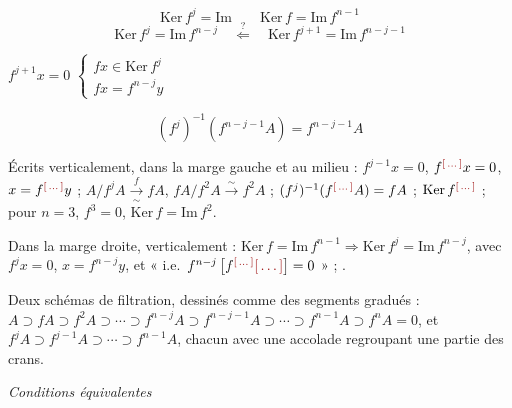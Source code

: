 \documentclass[11pt,a4paper]{article}
\begin{document}
\[
\mathrm{Ker}\, f^j = \mathrm{Im} \qquad
\mathrm{Ker}\, f = \mathrm{Im}\, f^{n-1}
\]
\[
\mathrm{Ker}\, f^j = \mathrm{Im}\, f^{n-j}
\quad\overset{?}{\Longleftarrow}\quad
\mathrm{Ker}\, f^{j+1} = \mathrm{Im}\, f^{n-j-1}
\]

$f^{j+1}x = 0$ \quad $\left\lbrace
\begin{array}{l}
fx \in \mathrm{Ker}\, f^j \\
fx = f^{n-j}y
\end{array}\right.$

\[
(f^j)^{-1}(f^{n-j-1}A) = f^{n-j-1}A
\]

Écrits verticalement, dans la marge gauche et au milieu :
$f^{j-1}x = 0$, $f^{\ill{}}x = 0$, $x = f^{\ill{}}y$ ;
$A/f^{j}A \xrightarrow[\sim]{f} fA$,
$fA/f^2A \xrightarrow{\sim} f^2A$ ;
$(f^j)^{-1}(f^{\ill{}}A) = fA$ ; $\mathrm{Ker}\, f^{\ill{}}$ ;
pour $n = 3$, $f^3 = 0$, $\mathrm{Ker}\, f = \mathrm{Im}\, f^2$.

Dans la marge droite, verticalement :
$\mathrm{Ker}\, f = \mathrm{Im}\, f^{n-1} \Rightarrow
\mathrm{Ker}\, f^{j} = \mathrm{Im}\, f^{n-j}$, avec
$f^{j}x = 0$, $x = f^{n-j}y$, et
« i.e.\ $f^{n-j}\left[ f^{\ill{}} \ill{} \right] = 0$ » ;
\struck{\ill{}}.

Deux schémas de filtration, dessinés comme des segments gradués :
$A \supset fA \supset f^2A \supset \cdots \supset f^{n-j}A \supset
f^{n-j-1}A \supset \cdots \supset f^{n-1}A \supset f^nA = 0$,
et $f^{j}A \supset f^{j-1}A \supset \cdots \supset f^{n-1}A$, chacun avec
une accolade regroupant une partie des crans.

\emph{Conditions équivalentes}
\end{document}
